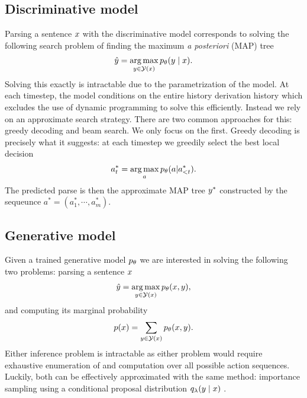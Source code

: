 \subsection{Discriminative model}
Parsing a sentence $x$ with the discriminative model corresponds to solving the following search problem of finding the maximum \textit{a posteriori} (MAP) tree
\begin{align*}
  \hat{y} = \operatorname*{arg\,max}_{ y \in \mathcal{Y}(x) } p_{\theta}(y \mid x).
\end{align*}
Solving this exactly is intractable due to the parametrization of the model. At each timestep, the model conditions on the entire history derivation history which excludes the use of dynamic programming to solve this efficiently. Instead we rely on an approximate search strategy. There are two common approaches for this: greedy decoding and beam search. We only focus on the first. Greedy decoding is precisely what it suggests: at each timestep we greedily select the best local decision
\begin{align*}
  a^{*}_t = \operatorname*{arg\,max}_{a} p_{\theta}(a|a^{*}_{< t}).
\end{align*}
The predicted parse is then the approximate MAP tree $y^*$ constructed by the sequeunce $a^* = (a^{*}_1, \cdots, a^{*}_m)$.

\subsection{Generative model}
Given a trained generative model $p_{\theta}$ we are interested in solving the following two problems: parsing a sentence $x$
\begin{align*}
  \hat{y} = \operatorname*{arg\,max}_{ y \in \mathcal{Y}(x) } p_{\theta}(x, y),
\end{align*}
and computing its marginal probability
\begin{align*}
  p(x) = \sum_{ y \in \mathcal{Y}(x) } p_{\theta}(x, y).
\end{align*}
Either inference problem is intractable as either problem would require exhaustive enumeration of and computation over all possible action sequences.  Luckily, both can be effectively approximated with the same method: importance sampling using a conditional proposal distribution $q_{\lambda}(y \mid x)$ \citep{dyer2016rnng}.

